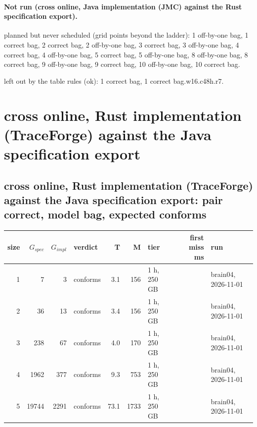 \documentclass[10pt]{article}
\begin{document}
\paragraph{Not run (cross online, Java implementation (JMC) against the Rust specification export).}
planned but never scheduled (grid points beyond the ladder): 1 off-by-one bag, 1 correct bag, 2 correct bag, 2 off-by-one bag, 3 correct bag, 3 off-by-one bag, 4 correct bag, 4 off-by-one bag, 5 correct bag, 5 off-by-one bag, 8 off-by-one bag, 8 correct bag, 9 off-by-one bag, 9 correct bag, 10 off-by-one bag, 10 correct bag.\par
left out by the table rules (ok): 1 correct bag, 1 correct bag.w16.c48h.r7.\par
\section*{cross online, Rust implementation (TraceForge) against the Java specification export}
\subsection*{cross online, Rust implementation (TraceForge) against the Java specification export: pair \textsf{correct}, model bag, expected conforms}
\begin{longtable}{@{}rrrlrrlrl@{}}
\toprule
size & $G_{\mathit{spec}}$ & $G_{\mathit{impl}}$ & verdict & T & M & tier & first miss ms & run \\
\midrule
\endhead
\color{red} 1 & 7 & 3 & conforms & 3.1 & 156 & 1 h, 250 GB &  & brain04, 2026-11-01 \\
\color{red} 2 & 36 & 13 & conforms & 3.4 & 156 & 1 h, 250 GB &  & brain04, 2026-11-01 \\
\color{red} 3 & 238 & 67 & conforms & 4.0 & 170 & 1 h, 250 GB &  & brain04, 2026-11-01 \\
\color{red} 4 & 1962 & 377 & conforms & 9.3 & 753 & 1 h, 250 GB &  & brain04, 2026-11-01 \\
\color{red} 5 & 19744 & 2291 & conforms & 73.1 & 1733 & 1 h, 250 GB &  & brain04, 2026-11-01 \\
\bottomrule
\end{longtable}
\end{document}
